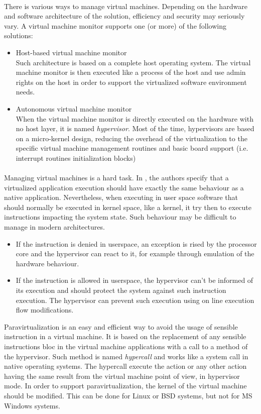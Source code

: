 \paragraph{}
There is various ways to manage virtual machines. Depending on the hardware and software
architecture of the solution, efficiency and security may seriously vary. A virtual machine
monitor supports one (or more) of the following solutions:
\begin{itemize}
\item Host-based virtual machine monitor\\
      Such architecture is based on a complete host operating system. The virtual machine monitor is
      then executed like a process of the host and use admin rights on the host in order to support the
      virtualized software environment needs.
\item Autonomous virtual machine monitor\\
      When the virtual machine monitor is directly executed on the hardware with no host layer,
      it is named {\it hypervisor}. Most of the time, hypervisors are based on a micro-kernel
      design, reducing the overhead of the virtualization to the specific virtual machine management
      routines and basic board support (i.e. interrupt routines initialization blocks)
\end{itemize}

\paragraph{}
Managing virtual machines is a hard task. In \cite{popek}, the authors specify that a virtualized
application execution should have exactly the same behaviour as a native application. Nevertheless,
when executing in user space software that should normally be executed in kernel space, like a
kernel, it try then to execute instructions impacting the system state. Such behaviour may be
difficult to manage in modern architectures.
\begin{itemize}
\item If the instruction is denied in userspace, an exception is rised by the processor core and
the hypervisor can react to it, for example through emulation of the hardware behaviour.
\item If the instruction is allowed in userspace, the hypervisor can't be informed of its execution
and should protect the system against such instruction execution. The hypervisor can prevent such
execution using on line execution flow modifications.
\end{itemize}
Paravirtualization is an easy and efficient way to avoid the usage of sensible instruction in a
virtual machine. It is based on the replacement of any sensible instructions bloc in the virtual
machine applications with a call to a method of the hypervisor. Such method is named {\it
hypercall} and works like a system call in native operating systems. The hypercall execute the
action or any other action having the same result from the virtual machine point of view, in
hypervisor mode. In order to support paravirtualization, the kernel of the virtual machine should
be modified. This can be done for Linux or BSD systems, but not for MS Windows systems.

